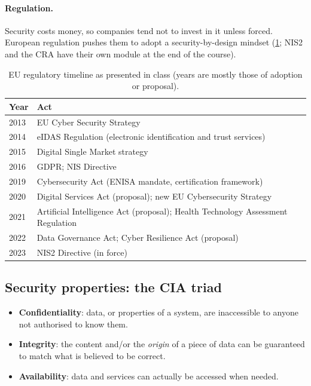\paragraph{Regulation.} Security costs money, so companies tend not to invest in it unless forced. European regulation pushes them to adopt a security-by-design mindset (\cref{tab:eu-regulation}; NIS2 and the CRA have their own module at the end of the course).

\begin{table}[H]
\centering
\caption{EU regulatory timeline as presented in class (years are mostly those of adoption or proposal).}
\label{tab:eu-regulation}
\begin{tabular}{@{}ll@{}}
\toprule
Year & Act \\
\midrule
2013 & EU Cyber Security Strategy \\
2014 & eIDAS Regulation (electronic identification and trust services) \\
2015 & Digital Single Market strategy \\
2016 & GDPR; NIS Directive \\
2019 & Cybersecurity Act (ENISA mandate, certification framework) \\
2020 & Digital Services Act (proposal); new EU Cybersecurity Strategy \\
2021 & Artificial Intelligence Act (proposal); Health Technology Assessment Regulation \\
2022 & Data Governance Act; Cyber Resilience Act (proposal) \\
2023 & NIS2 Directive (in force) \\
\bottomrule
\end{tabular}
\end{table}

\subsection{Security properties: the CIA triad}

\begin{definition}
\leavevmode
\begin{itemize}
    \item \textbf{Confidentiality}: data, or properties of a system, are inaccessible to anyone not authorised to know them.
    \item \textbf{Integrity}: the content and/or the \emph{origin} of a piece of data can be guaranteed to match what is believed to be correct.
    \item \textbf{Availability}: data and services can actually be accessed when needed.
\end{itemize}
\end{definition}

